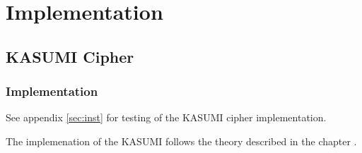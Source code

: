\chapter{Implementation}
\label{ch:impl}
\section{KASUMI Cipher}
\subsection{Implementation}

See appendix \ref{sec:inst} for testing of the KASUMI cipher implementation.

The implemenation of the KASUMI follows the theory described in the
chapter .

